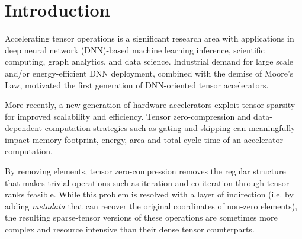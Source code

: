 \chapter{Introduction}
\label{chapter:introduction}

Accelerating tensor operations is a significant research area with applications in deep neural network (DNN)-based machine learning inference\cite{eyeriss}\cite{eyerissv2}\cite{tpu}\cite{extensor}, scientific computing\cite{sci_tensor}, graph analytics\cite{mattson2013standards}, and data science\cite{mcauley2013hidden}\cite{kolda2009tensor}\cite{bader2008discussion}. Industrial demand for large scale\cite{tpu} and/or energy-efficient\cite{eyeriss} DNN deployment, combined with the demise of Moore's Law\cite{moore}, motivated the first generation of DNN-oriented tensor accelerators\cite{eyeriss}\cite{tpu}.

More recently, a new generation of hardware accelerators exploit tensor sparsity for improved scalability and efficiency\cite{ampere}\cite{eyerissv2}\cite{sparten}\cite{sparch}\cite{scnn}\cite{candles}\cite{extensor}. Tensor zero-compression\cite{szebook}\cite{sparseloop}\cite{extensor} and data-dependent computation strategies such as gating and skipping\cite{szebook}\cite{sparseloop} can meaningfully impact memory footprint, energy, area and total cycle time of an accelerator computation\cite{szebook}\cite{sparseloop}.

By removing elements, tensor zero-compression removes the regular structure that makes trivial operations such as iteration and co-iteration through tensor ranks feasible. While this problem is resolved with a layer of indirection (i.e. by adding \textit{metadata} that can recover the original coordinates of non-zero elements\cite{szebook}), the resulting sparse-tensor versions of these operations are sometimes more complex and resource intensive than their dense tensor counterparts\cite{extensor}\cite{sparten}\cite{sparch}\cite{ampere}. 


